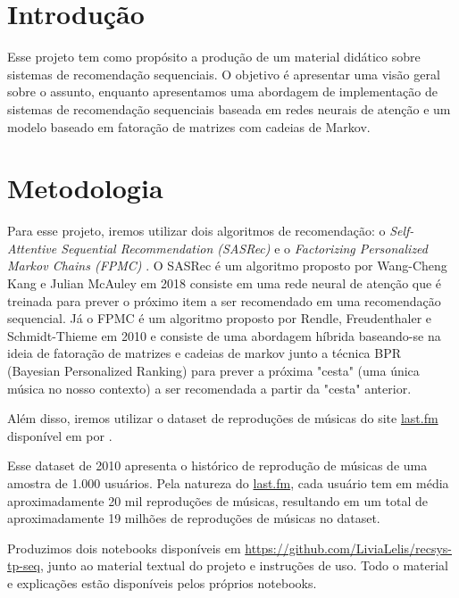 \nocite{srssbrs} %

\section*{Introdução}

Esse projeto tem como propósito a produção de um material didático
sobre sistemas de recomendação sequenciais.
O objetivo é apresentar uma visão geral sobre o assunto, enquanto
apresentamos uma abordagem de implementação de sistemas de recomendação
sequenciais baseada em  redes neurais de atenção e um modelo baseado em 
fatoração de matrizes com cadeias de Markov.

\section*{Metodologia}

Para esse projeto, iremos utilizar dois algoritmos de recomendação:
o \textit{Self-Attentive Sequential Recommendation (SASRec)} \cite{sasrec} e
o \textit{Factorizing Personalized Markov Chains (FPMC)} \cite{fpmc}.
O SASRec é um algoritmo proposto por Wang-Cheng Kang e Julian McAuley em 2018
consiste em uma rede neural de atenção que é treinada para prever o
próximo item a ser recomendado em uma recomendação sequencial. Já o FPMC é
um algoritmo proposto por Rendle, Freudenthaler e Schmidt-Thieme em 2010
e consiste de uma abordagem híbrida baseando-se na ideia de fatoração de 
matrizes e cadeias de markov junto a técnica BPR (Bayesian Personalized Ranking)
para prever a próxima "cesta" (uma única música no nosso contexto) a ser 
recomendada a partir da "cesta" anterior.

Além disso, iremos utilizar o dataset de reproduções de músicas
do site \url{last.fm} disponível em 
\cite{lastfm_dataset} por \citeauthor{lastfm_book} \cite{lastfm_book}.

Esse dataset de 2010 apresenta o histórico de reprodução de músicas
de uma amostra de 1.000 usuários. Pela natureza do \url{last.fm},
cada usuário tem em média aproximadamente 20 mil reproduções de músicas,
resultando em um total de aproximadamente 19 milhões de reproduções
de músicas no dataset.

Produzimos dois notebooks disponíveis em
\url{https://github.com/LiviaLelis/recsys-tp-seq}, junto ao material textual do
projeto e instruções de uso. Todo o material e explicações estão disponíveis
pelos próprios notebooks.

